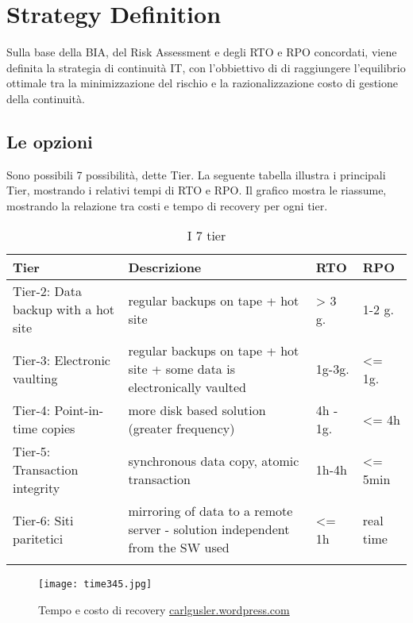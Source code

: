 \newpage
\section{Strategy Definition}
Sulla base della BIA, del Risk Assessment e degli RTO e RPO concordati, viene definita la strategia di continuità IT, con l'obbiettivo di di raggiungere l'equilibrio ottimale tra la minimizzazione del rischio e la razionalizzazione costo di gestione della continuità.\\

\subsection{Le opzioni}
Sono possibili 7 possibilità, dette Tier. La seguente tabella illustra i principali Tier, mostrando i relativi tempi di RTO e RPO. Il grafico mostra le riassume, mostrando la relazione tra costi e tempo di recovery per ogni tier.

\renewcommand\arraystretch{1,5}
\begin{longtable}{p{} p{} p{} p{} }
\toprule
\textbf{Tier} & Descrizione & RTO & RPO \\
\toprule
Tier-2: Data backup with a hot site &
regular backups on tape + hot site &
> 3 g. & 1-2 g. \\
Tier-3: \hspace{2cm} Electronic vaulting &
regular backups on tape + hot site + some data is electronically vaulted &
1g-3g. & <= 1g. \\
Tier-4: \hspace{2cm} Point-in-time copies &
more disk based solution (greater frequency) &
4h - 1g. & <= 4h \\
Tier-5: Transaction integrity
& synchronous data copy, atomic transaction &
1h-4h & <= 5min \\
Tier-6: \hspace{2cm} Siti paritetici &
mirroring of data to a remote server - solution independent from the SW used &
<= 1h & real time \\
\bottomrule
\caption{I 7 tier}
\end{longtable}

\begin{figure}[H]
\centering
\texttt{[image: time345.jpg]}
\caption{Tempo e costo di recovery \href{https://carlgusler.wordpress.com/2008/05/07/seven-levels-of-disaster-recovery-protection/}{carlgusler.wordpress.com}}
\end{figure}

